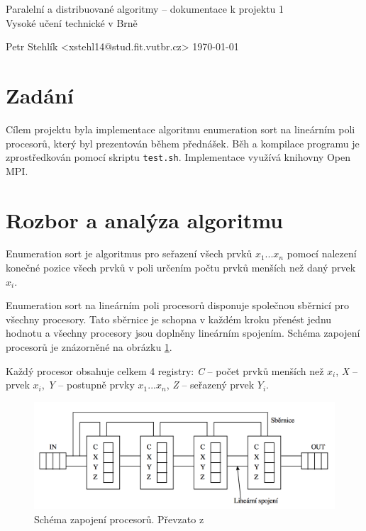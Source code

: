 \documentclass[11pt,a4paper]{article}
\begin{document}
\begin{center}
	\LARGE{Paralelní a distribuované algoritmy -- dokumentace k projektu 1}\\
	\large{Vysoké učení technické v Brně}
	\vspace{0.2cm}

	Petr Stehlík <xstehl14@stud.fit.vutbr.cz>     \today

\end{center}

\section{Zadání}

Cílem projektu byla implementace algoritmu enumeration sort na lineárním poli procesorů, který byl prezentován během přednášek. Běh a kompilace programu je zprostředkován pomocí skriptu \texttt{test.sh}. Implementace využívá knihovny Open MPI\cite{bib:openmpi}.


\section{Rozbor a analýza algoritmu}

Enumeration sort je algoritmus pro seřazení všech prvků $x_1...x_n$ pomocí nalezení konečné pozice všech prvků v poli určením počtu prvků menších než daný prvek $x_i$.

Enumeration sort na lineárním poli procesorů disponuje společnou sběrnicí pro všechny procesory. Tato sběrnice je schopna v každém kroku přenést jednu hodnotu a všechny procesory jsou doplněny lineárním spojením. Schéma zapojení procesorů je znázorněné na obrázku \ref{schema}.

Každý procesor obsahuje celkem 4 registry: \textit{C} -- počet prvků menších než $x_i$, \textit{X} -- prvek $x_i$, \textit{Y} -- postupně prvky $x_1 ... x_n$, \textit{Z} -- seřazený prvek $Y_i$.

\begin{figure}[h]
    \includegraphics[width=0.7\linewidth]{schema}
    \centering
    \caption{Schéma zapojení procesorů. Převzato z \cite{bib:schema}}
    \label{schema}
\end{figure}
\end{document}
